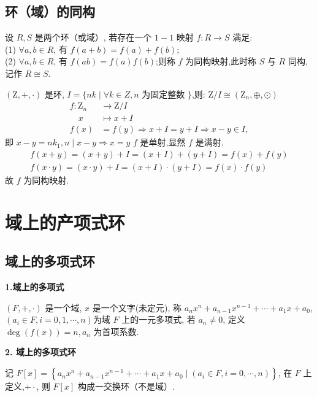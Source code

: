 \subsection{环（域）的同构}

设 $ R, S $ 是两个环（或域）, 若存在一个 $ 1-1 $ 映射 $ f: R \rightarrow S $ 满足:\\
(1) $ \forall a, b \in R $, 有 $ f(a+b)=f(a)+f(b) $;\\
(2) $ \forall a, b \in R $, 有 $ f(a b)=f(a) f(b) $;则称 $ f $ 为同构映射,此时称 $ S $ 与 $ R $ 同构,记作 $ R \cong S $.
\begin{example}
    $ (\mathrm{Z},+, \cdot) $ 是环, $ I=\{n k \mid \forall k \in Z, n $ 为固定整数 $ \} $,则: $ \mathrm{Z} / I \cong\left(\mathrm{Z}_{n}, \oplus, \odot\right) $
    $$
\begin{aligned}
f: \mathrm{Z}_{n} & \rightarrow \mathrm{Z} / I \\
\quad x & \mapsto x+I \\
f(x) & =f(y) \Rightarrow x+I=y+I \Rightarrow x-y \in I,
\end{aligned}
$$
即 $ x-y=n k_{1}, n \mid x-y \Rightarrow x=y $
$ f $ 是单射,显然 $ f $ 是满射.
$$
\begin{array}{l}
f(x+y)=(x+y)+I=(x+I)+(y+I)=f(x)+f(y) \\
f(x \cdot y)=(x \cdot y)+I=(x+I) \cdot(y+I)=f(x) \cdot f(y)
\end{array}
$$
故 $ f $ 为同构映射.
\end{example}

\section{域上的产项式环}

\subsection{域上的多项式环}

\textbf{1.域上的多项式} 

$ (F,+, \cdot) $ 是一个域, $ x $ 是一个文字(未定元), 称 $ a_{n} x^{n}+a_{n-1} x^{n-1}+\cdots+a_{1} x+a_{0} $,\\$\left(a_{i} \in F, i=0,1, \cdots, n\right) $为域 $ F $ 上的一元多项式, 若 $ a_{n} \neq 0 $, 定义 $ \operatorname{deg}(f(x))=n, a_{n} $ 为首项系数.

\textbf{2. 域上的多项式环}

记 $ F[x]=\left\{a_{n} x^{n}+a_{n-1} x^{n-1}+\cdots+a_{1} x+a_{0} \mid\left(a_{i} \in F, i=0, \cdots, n\right)\right\} $, 在 $ F $ 上定义,$ + \cdot $, 则 $ F[x] $ 构成一交换环（不是域）.

